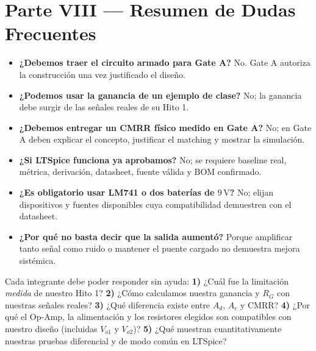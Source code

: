 \documentclass[10pt, a4paper]{article}
\begin{document}
\section*{Parte VIII — Resumen de Dudas Frecuentes}
\begin{itemize}
    \setlength{\itemsep}{1pt}
    \footnotesize
    \item \textbf{¿Debemos traer el circuito armado para Gate A?} No. Gate A autoriza la construcción una vez justificado el diseño.
    \item \textbf{¿Podemos usar la ganancia de un ejemplo de clase?} No; la ganancia debe surgir de las señales reales de su Hito 1.
    \item \textbf{¿Debemos entregar un CMRR físico medido en Gate A?} No; en Gate A deben explicar el concepto, justificar el matching y mostrar la simulación.
    \item \textbf{¿Si LTSpice funciona ya aprobamos?} No; se requiere baseline real, métrica, derivación, datasheet, fuente válida y BOM confirmado.
    \item \textbf{¿Es obligatorio usar LM741 o dos baterías de $9\,\text{V}$?} No; elijan dispositivos y fuentes disponibles cuya compatibilidad demuestren con el datasheet.
    \item \textbf{¿Por qué no basta decir que la salida aumentó?} Porque amplificar tanto señal como ruido o mantener el puente cargado no demuestra mejora sistémica.
\end{itemize}

\begin{tcolorbox}[colback=neutralbg, colframe=ucbblue, title=\textbf{Parte IX — Autoverificación Individual en Cinco Preguntas (Antes de llamar al docente)}]
    \footnotesize
    Cada integrante debe poder responder sin ayuda: \textbf{1)} ¿Cuál fue la limitación \textit{medida} de nuestro Hito 1? \textbf{2)} ¿Cómo calculamos nuestra ganancia y $R_G$ con nuestras señales reales? \textbf{3)} ¿Qué diferencia existe entre $A_d$, $A_c$ y CMRR? \textbf{4)} ¿Por qué el Op-Amp, la alimentación y los resistores elegidos son compatibles con nuestro diseño (incluidas $V_{o1}$ y $V_{o2}$)? \textbf{5)} ¿Qué muestran cuantitativamente nuestras pruebas diferencial y de modo común en LTSpice?
\end{tcolorbox}
\end{document}
